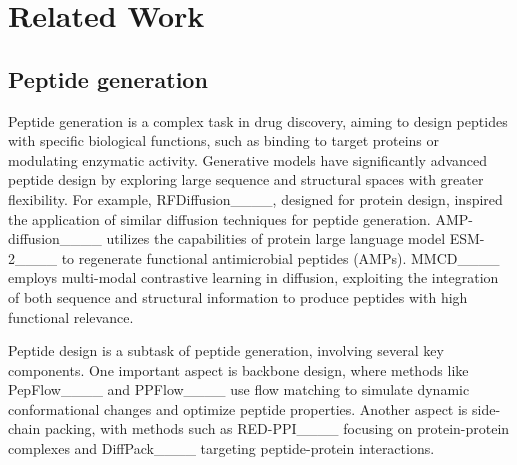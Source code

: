 \section{Related Work}
\subsection{Peptide generation}
Peptide generation is a complex task in drug discovery, aiming to design peptides with specific biological functions, such as binding to target proteins or modulating enzymatic activity. 
Generative models have significantly advanced peptide design by exploring large sequence and structural spaces with greater flexibility. For example, RFDiffusion____, designed for protein design, inspired the application of similar diffusion techniques for peptide generation. 
AMP-diffusion____ utilizes the capabilities of protein large language model ESM-2____ to regenerate functional antimicrobial peptides (AMPs). 
MMCD____ employs multi-modal contrastive learning in diffusion, exploiting the integration of both sequence and structural information to produce peptides with high functional relevance.

Peptide design is a subtask of peptide generation, involving several key components. 
One important aspect is backbone design, where methods like PepFlow____ and PPFlow____ use flow matching to simulate dynamic conformational changes and optimize peptide properties. 
Another aspect is side-chain packing, with methods such as RED-PPI____ focusing on protein-protein complexes and DiffPack____ targeting peptide-protein interactions.

